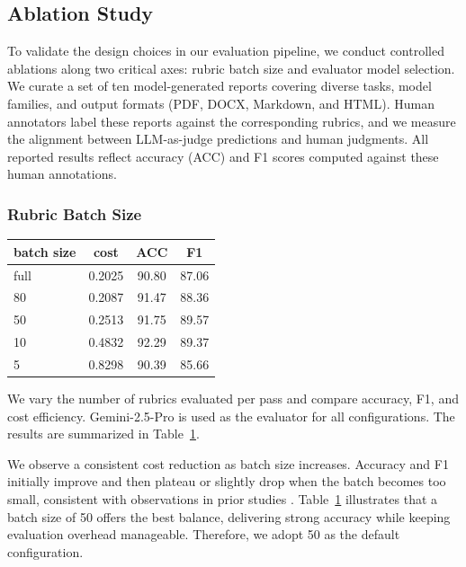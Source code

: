 \documentclass[11pt]{article}
\begin{document}
\subsection{Ablation Study}
\label{sec:ablation}
To validate the design choices in our evaluation pipeline, we conduct controlled ablations along two critical axes: rubric batch size and evaluator model selection. 
We curate a set of ten model-generated reports covering diverse tasks, model families, and output formats (PDF, DOCX, Markdown, and HTML). 
Human annotators label these reports against the corresponding rubrics, and we measure the alignment between LLM-as-judge predictions and human judgments. 
All reported results reflect accuracy (ACC) and F1 scores computed against these human annotations.

\subsubsection{Rubric Batch Size}

\begin{table}[h]
  \centering
  \begin{tabular}{lccc}
    \toprule
    \textbf{batch size} & \textbf{cost} & \textbf{ACC} & \textbf{F1} \\
    \midrule
    full & 0.2025 & 90.80 & 87.06 \\
    80   & 0.2087 & 91.47 & 88.36 \\
    50   & 0.2513 & 91.75 & 89.57 \\
    10   & 0.4832 & 92.29 & 89.37 \\
    5    & 0.8298 & 90.39 & 85.66 \\
    \bottomrule
    \end{tabular}
    \label{tab:batchsize}
  \end{table}

We vary the number of rubrics evaluated per pass and compare accuracy, F1, and cost efficiency. 
Gemini-2.5-Pro is used as the evaluator for all configurations. 
The results are summarized in Table~\ref{tab:batchsize}.

We observe a consistent cost reduction as batch size increases. 
Accuracy and F1 initially improve and then plateau or slightly drop when the batch becomes too small, consistent with observations in prior studies \citep{wang2025evaluatingllmsmultipleproblems}. 
Table~\ref{tab:batchsize} illustrates that a batch size of 50 offers the best balance, delivering strong accuracy while keeping evaluation overhead manageable. 
Therefore, we adopt 50 as the default configuration.
\end{document}
